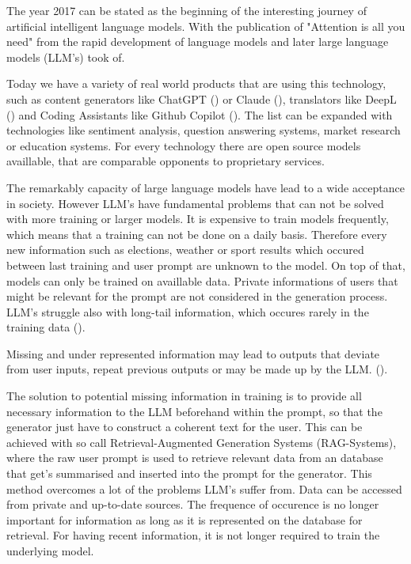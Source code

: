 The year 2017 can be stated as the beginning of the interesting journey of artificial intelligent language models. With the publication of "Attention is all you need" from \citet{vaswani2023attentionneed} the rapid development of language models and later large language models (LLM's) took of. 

Today we have a variety of real world products that are using this technology, such as content generators like ChatGPT (\citet{OpenAI_2022}) or Claude (\citet{Anthropic_2023}), translators like DeepL (\citet{DeepL_SE}) and Coding Assistants like Github Copilot (\citet{Friedman_2022}). The list can be expanded with technologies like sentiment analysis, question answering systems, market research or education systems. For every technology there are open source models availlable, that are comparable opponents to proprietary services. 

The remarkably capacity of large language models have lead to a wide acceptance in society. However LLM's have fundamental problems that can not be solved with more training or larger models. It is expensive to train models frequently, which means that a training can not be done on a daily basis. Therefore every new information such as elections, weather or sport results which occured between last training and user prompt are unknown to the model. On top of that, models can only be trained on availlable data. Private informations of users that might be relevant for the prompt are not considered in the generation process. LLM's struggle also with long-tail information, which occures rarely in the training data (\citet{Kandpal.15.11.2022}).

Missing and under represented information may lead to outputs that deviate from user inputs, repeat previous outputs or may be made up by the LLM. (\citet{Zhang.03.09.2023}). 

The solution to potential missing information in training is to provide all necessary information to the LLM beforehand within the prompt, so that the generator just have to construct a coherent text for the user. This can be achieved with so call Retrieval-Augmented Generation Systems (RAG-Systems), where the raw user prompt is used to retrieve relevant data from an database that get's summarised and inserted into the prompt for the generator. This method overcomes a lot of the problems LLM's suffer from. Data can be accessed from private and up-to-date sources. The frequence of occurence is no longer important for information as long as it is represented on the database for retrieval. For having recent information, it is not longer required to train the underlying model.

